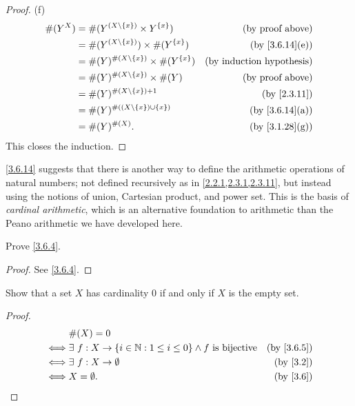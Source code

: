\begin{proof}{(f)}
  \begin{align*}
    \#(Y^X) & = \#(Y^{(X \setminus \{x\})} \times Y^{\{x\}})       & \text{(by proof above)}          \\
            & = \#(Y^{(X \setminus \{x\})}) \times \#(Y^{\{x\}})   & \text{(by \cref{3.6.14}(e))}     \\
            & = \#(Y)^{\#(X \setminus \{x\})} \times \#(Y^{\{x\}}) & \text{(by induction hypothesis)} \\
            & = \#(Y)^{\#(X \setminus \{x\})} \times \#(Y)         & \text{(by proof above)}          \\
            & = \#(Y)^{\#(X \setminus \{x\}) + 1}                  & \text{(by \cref{2.3.11})}        \\
            & = \#(Y)^{\#((X \setminus \{x\}) \cup \{x\})}         & \text{(by \cref{3.6.14}(a))}     \\
            & = \#(Y)^{\#(X)}.                                     & \text{(by \cref{3.1.28}(g))}
  \end{align*}
  This closes the induction.
\end{proof}

\begin{rmk}\label{3.6.15}
  \cref{3.6.14} suggests that there is another way to define the arithmetic operations of natural numbers;
  not defined recursively as in \cref{2.2.1,2.3.1,2.3.11}, but instead using the notions of union, Cartesian product, and power set.
  This is the basis of \emph{cardinal arithmetic}, which is an alternative foundation to arithmetic than the Peano arithmetic we have developed here.
\end{rmk}

\exercisesection

\begin{ex}\label{ex:3.6.1}
  Prove \cref{3.6.4}.
\end{ex}

\begin{proof}
  See \cref{3.6.4}.
\end{proof}

\begin{ex}\label{ex:3.6.2}
  Show that a set \(X\) has cardinality \(0\) if and only if \(X\) is the empty set.
\end{ex}

\begin{proof}
  \begin{align*}
         & \#(X) = 0                                                                                                 \\
    \iff & \exists\ f : X \to \{i \in \N : 1 \leq i \leq 0\} \land f \text{ is bijective} & \text{(by \cref{3.6.5})} \\
    \iff & \exists\ f : X \to \emptyset                                                   & \text{(by \cref{3.2})}   \\
    \iff & X = \emptyset.                                                                 & \text{(by \cref{3.6})}
  \end{align*}
\end{proof}

